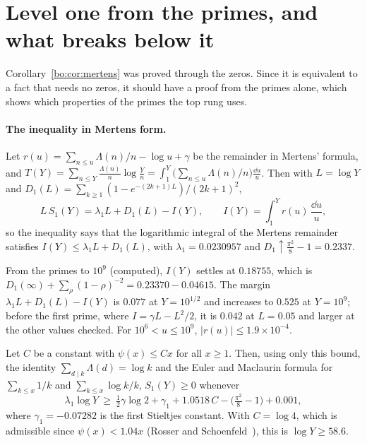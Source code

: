 \section{Level one from the primes, and what breaks below it}\label{bo:sec:levelone}

Corollary~\ref{bo:cor:mertens} was proved through the zeros. Since it is equivalent to a fact that needs no zeros, it should have a proof from the primes alone, which shows which properties of the primes the top rung uses.

\paragraph{The inequality in Mertens form.} Let $r(u)=\sum_{n\le u}\Lambda(n)/n-\log u+\gamma$ be the remainder in Mertens' formula, and $T(Y)=\sum_{n\le Y}\frac{\Lambda(n)}n\log\frac Yn=\int_1^Y\bigl(\sum_{n\le u}\Lambda(n)/n\bigr)\frac{\dd u}u$. Then with $L=\log Y$ and $D_1(L)=\sum_{k\ge1}(1-e^{-(2k+1)L})/(2k+1)^2$,
\[
L\,S_1(Y)=\lambda_1L+D_1(L)-I(Y),\qquad I(Y)=\int_1^Yr(u)\,\frac{\dd u}{u},
\]
so the inequality says that the logarithmic integral of the Mertens remainder satisfies $I(Y)\le\lambda_1L+D_1(L)$, with $\lambda_1=0.0230957$ and $D_1\uparrow\frac{\pi^2}8-1=0.2337$.

\begin{computation}\label{bo:comp:levelone}
From the primes to $10^9$ (computed), $I(Y)$ settles at $0.18755$, which is $D_1(\infty)+\sum_\rho(1-\rho)^{-2}=0.23370-0.04615$. The margin $\lambda_1L+D_1(L)-I(Y)$ is $0.077$ at $Y=10^{1/2}$ and increases to $0.525$ at $Y=10^9$; before the first prime, where $I=\gamma L-L^2/2$, it is $0.042$ at $L=0.05$ and larger at the other values checked. For $10^6<u\le10^9$, $|r(u)|\le1.9\times10^{-4}$.
\end{computation}

\begin{theorem}\label{bo:thm:elementary}
Let $C$ be a constant with $\psi(x)\le Cx$ for all $x\ge1$. Then, using only this bound, the identity $\sum_{d\mid k}\Lambda(d)=\log k$ and the Euler and Maclaurin formula for $\sum_{k\le x}1/k$ and $\sum_{k\le x}\log k/k$,
$S_1(Y)\ge0$ whenever
\[
\lambda_1\log Y\ \ge\ \tfrac12\gamma\log2+\gamma_1+1.0518\,C-\bigl(\tfrac{\pi^2}8-1\bigr)+0.001,
\]
where $\gamma_1=-0.07282$ is the first Stieltjes constant. With $C=\log4$, which is admissible since $\psi(x)<1.04x$ (Rosser and Schoenfeld~\cite{RS62}), this is $\log Y\ge58.6$.
\end{theorem}

